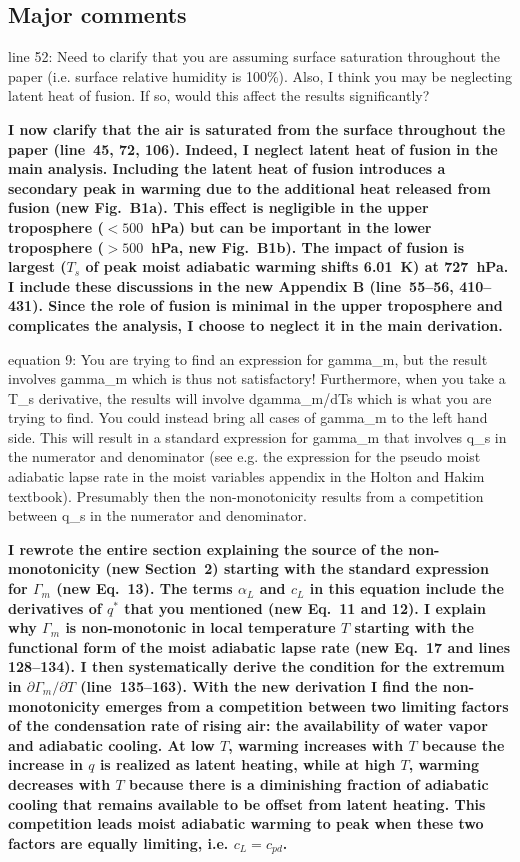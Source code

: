 \documentclass{article}
\begin{document}
\subsection{Major comments}
line 52: Need to clarify that you are assuming surface saturation throughout the paper (i.e. surface relative humidity is 100\%). Also, I think you may be neglecting latent heat of fusion. If so, would this affect the results significantly?
\par
\textbf{I now clarify that the air is saturated from the surface throughout the paper (line~45, 72, 106). Indeed, I neglect latent heat of fusion in the main analysis. Including the latent heat of fusion introduces a secondary peak in warming due to the additional heat released from fusion (new Fig.~B1a). This effect is negligible in the upper troposphere ($<500$~hPa) but can be important in the lower troposphere ($>500$~hPa, new Fig.~B1b). The impact of fusion is largest ($T_s$ of peak moist adiabatic warming shifts 6.01~K) at 727~hPa. I include these discussions in the new Appendix B (line~55--56, 410--431). Since the role of fusion is minimal in the upper troposphere and complicates the analysis, I choose to neglect it in the main derivation.}
\par
equation 9: You are trying to find an expression for gamma\_m, but the result involves gamma\_m which is thus not satisfactory! Furthermore, when you take a T\_s derivative, the results will involve dgamma\_m/dTs which is what you are trying to find. You could instead bring all cases of gamma\_m to the left hand side. This will result in a standard expression for gamma\_m that involves q\_s in the numerator and denominator (see e.g. the expression for the pseudo moist adiabatic lapse rate in the moist variables appendix in the Holton and Hakim textbook). Presumably then the non-monotonicity results from a competition between q\_s in the numerator and denominator.
\par
\textbf{I rewrote the entire section explaining the source of the non-monotonicity (new Section~2) starting with the standard expression for $\Gamma_m$ (new Eq.~13). The terms $\alpha_L$ and $c_L$ in this equation include the derivatives of $q^*$ that you mentioned (new Eq.~11 and 12). I explain why $\Gamma_m$ is non-monotonic in local temperature $T$ starting with the functional form of the moist adiabatic lapse rate (new Eq.~17 and lines 128--134). I then systematically derive the condition for the extremum in $\partial\Gamma_m/\partial T$ (line~135--163). With the new derivation I find the non-monotonicity emerges from a competition between two limiting factors of the condensation rate of rising air: the availability of water vapor and adiabatic cooling. At low $T$, warming increases with $T$ because the increase in $q$ is realized as latent heating, while at high $T$, warming decreases with $T$ because there is a diminishing fraction of adiabatic cooling that remains available to be offset from latent heating. This competition leads moist adiabatic warming to peak when these two factors are equally limiting, i.e. $c_L = c_{pd}$.}
\end{document}

